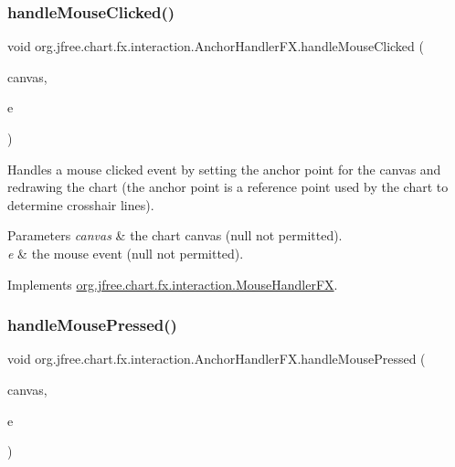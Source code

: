 \subsubsection{\texorpdfstring{handle\+Mouse\+Clicked()}{handleMouseClicked()}}
{\footnotesize\ttfamily void org.\+jfree.\+chart.\+fx.\+interaction.\+Anchor\+Handler\+F\+X.\+handle\+Mouse\+Clicked (\begin{DoxyParamCaption}\item[{\mbox{\hyperlink{classorg_1_1jfree_1_1chart_1_1fx_1_1_chart_canvas}{Chart\+Canvas}}}]{canvas,  }\item[{Mouse\+Event}]{e }\end{DoxyParamCaption})}

Handles a mouse clicked event by setting the anchor point for the canvas and redrawing the chart (the anchor point is a reference point used by the chart to determine crosshair lines).


\begin{DoxyParams}{Parameters}
{\em canvas} & the chart canvas ({\ttfamily null} not permitted). \\
\hline
{\em e} & the mouse event ({\ttfamily null} not permitted). \\
\hline
\end{DoxyParams}


Implements \mbox{\hyperlink{interfaceorg_1_1jfree_1_1chart_1_1fx_1_1interaction_1_1_mouse_handler_f_x_aa1761ee25681cfee7de718c887d4ae5e}{org.\+jfree.\+chart.\+fx.\+interaction.\+Mouse\+Handler\+FX}}.

\mbox{\label{classorg_1_1jfree_1_1chart_1_1fx_1_1interaction_1_1_anchor_handler_f_x_aae8e995d9a03393fb8eee9d45d81c23b}} 
\subsubsection{\texorpdfstring{handle\+Mouse\+Pressed()}{handleMousePressed()}}
{\footnotesize\ttfamily void org.\+jfree.\+chart.\+fx.\+interaction.\+Anchor\+Handler\+F\+X.\+handle\+Mouse\+Pressed (\begin{DoxyParamCaption}\item[{\mbox{\hyperlink{classorg_1_1jfree_1_1chart_1_1fx_1_1_chart_canvas}{Chart\+Canvas}}}]{canvas,  }\item[{Mouse\+Event}]{e }\end{DoxyParamCaption})}


